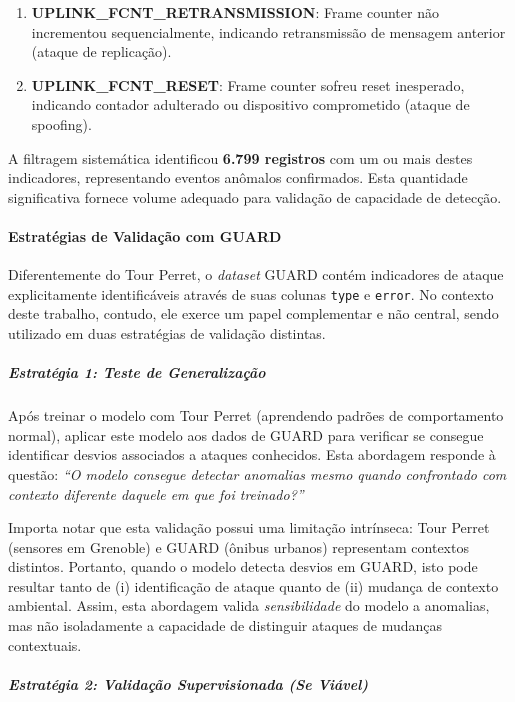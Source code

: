 \begin{enumerate}
    \item \textbf{UPLINK\_FCNT\_RETRANSMISSION}: Frame counter não incrementou 
    sequencialmente, indicando retransmissão de mensagem anterior (ataque de 
    replicação).
    
    \item \textbf{UPLINK\_FCNT\_RESET}: Frame counter sofreu reset inesperado, 
    indicando contador adulterado ou dispositivo comprometido (ataque de 
    spoofing).
\end{enumerate}

A filtragem sistemática identificou \textbf{6.799 registros} com um ou mais 
destes indicadores, representando eventos anômalos confirmados. Esta 
quantidade significativa fornece volume adequado para validação de capacidade 
de detecção.


\paragraph{Estratégias de Validação com GUARD}

Diferentemente do Tour Perret, o \textit{dataset} GUARD contém indicadores 
de ataque explicitamente identificáveis através de suas colunas 
\texttt{type} e \texttt{error}. No contexto deste trabalho, contudo, ele 
exerce um papel complementar e não central, sendo utilizado em duas 
estratégias de validação distintas.

\subparagraph{Estratégia 1: Teste de Generalização}

Após treinar o modelo com Tour Perret (aprendendo padrões de comportamento 
normal), aplicar este modelo aos dados de GUARD para verificar se consegue 
identificar desvios associados a ataques conhecidos. Esta abordagem responde 
à questão: \textit{``O modelo consegue detectar anomalias mesmo quando 
confrontado com contexto diferente daquele em que foi treinado?''}

Importa notar que esta validação possui uma limitação intrínseca: Tour 
Perret (sensores em Grenoble) e GUARD (ônibus urbanos) representam 
contextos distintos. Portanto, quando o modelo detecta desvios em GUARD, 
isto pode resultar tanto de (i) identificação de ataque quanto de 
(ii) mudança de contexto ambiental. Assim, esta abordagem valida 
\textit{sensibilidade} do modelo a anomalias, mas não isoladamente a 
capacidade de distinguir ataques de mudanças contextuais.

\subparagraph{Estratégia 2: Validação Supervisionada (Se Viável)}

